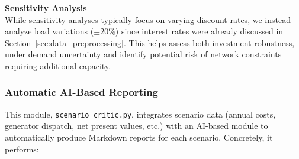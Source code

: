 \textbf{Sensitivity Analysis} \\
While sensitivity analyses typically focus on varying discount rates, we instead analyze load variations 
($\pm20\%$) since interest rates were already discussed in Section~\ref{sec:data_preprocessing}. This helps 
assess both investment robustness, under demand uncertainty and identify potential risk of network constraints 
requiring additional capacity.


\subsubsection{Automatic AI-Based Reporting}
\label{sec:ai_reporting}



This module, \texttt{scenario\_critic.py}, integrates scenario data (annual costs, generator dispatch, net
present values, etc.) with an AI-based module to automatically produce Markdown reports for each scenario. 
Concretely, it performs:

